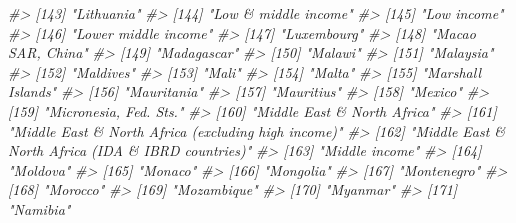 \documentclass[
  xelatex, ja=standard]{bxjsbook}
\newenvironment{Shaded}{\begin{snugshade}}{\end{snugshade}}
\newcommand{\CommentTok}[1]{\textcolor[rgb]{0.56,0.35,0.01}{\textit{#1}}}
\theoremstyle{definition}
\theoremstyle{definition}
\theoremstyle{definition}
\theoremstyle{definition}
\theoremstyle{remark}
\begin{document}
\begin{Shaded}
\begin{Highlighting}[]
\CommentTok{\#\textgreater{} [143] "Lithuania"                                           }
\CommentTok{\#\textgreater{} [144] "Low \& middle income"                                 }
\CommentTok{\#\textgreater{} [145] "Low income"                                          }
\CommentTok{\#\textgreater{} [146] "Lower middle income"                                 }
\CommentTok{\#\textgreater{} [147] "Luxembourg"                                          }
\CommentTok{\#\textgreater{} [148] "Macao SAR, China"                                    }
\CommentTok{\#\textgreater{} [149] "Madagascar"                                          }
\CommentTok{\#\textgreater{} [150] "Malawi"                                              }
\CommentTok{\#\textgreater{} [151] "Malaysia"                                            }
\CommentTok{\#\textgreater{} [152] "Maldives"                                            }
\CommentTok{\#\textgreater{} [153] "Mali"                                                }
\CommentTok{\#\textgreater{} [154] "Malta"                                               }
\CommentTok{\#\textgreater{} [155] "Marshall Islands"                                    }
\CommentTok{\#\textgreater{} [156] "Mauritania"                                          }
\CommentTok{\#\textgreater{} [157] "Mauritius"                                           }
\CommentTok{\#\textgreater{} [158] "Mexico"                                              }
\CommentTok{\#\textgreater{} [159] "Micronesia, Fed. Sts."                               }
\CommentTok{\#\textgreater{} [160] "Middle East \& North Africa"                          }
\CommentTok{\#\textgreater{} [161] "Middle East \& North Africa (excluding high income)"  }
\CommentTok{\#\textgreater{} [162] "Middle East \& North Africa (IDA \& IBRD countries)"   }
\CommentTok{\#\textgreater{} [163] "Middle income"                                       }
\CommentTok{\#\textgreater{} [164] "Moldova"                                             }
\CommentTok{\#\textgreater{} [165] "Monaco"                                              }
\CommentTok{\#\textgreater{} [166] "Mongolia"                                            }
\CommentTok{\#\textgreater{} [167] "Montenegro"                                          }
\CommentTok{\#\textgreater{} [168] "Morocco"                                             }
\CommentTok{\#\textgreater{} [169] "Mozambique"                                          }
\CommentTok{\#\textgreater{} [170] "Myanmar"                                             }
\CommentTok{\#\textgreater{} [171] "Namibia"                                             }

\end{Highlighting}
\end{Shaded}
\end{document}

